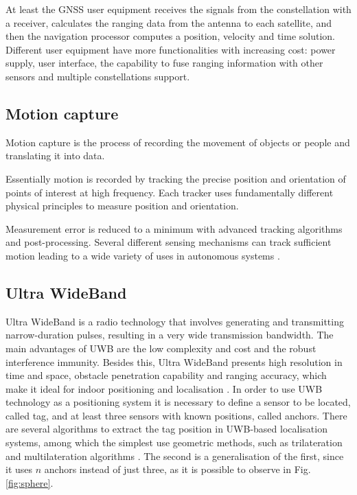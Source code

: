 \documentclass[journal]{IEEEtran}
\begin{document}
At least the GNSS user equipment receives the signals from the constellation with a receiver, calculates the ranging data from the antenna to each satellite, and then the navigation processor computes a position, velocity and time solution. Different user equipment have more functionalities with increasing cost: power supply, user interface, the capability to fuse ranging information with other sensors and multiple constellations support.

\subsection{Motion capture} 
Motion capture is the process of recording the movement of objects or people and translating it into data. 

Essentially motion is recorded by tracking the precise position and orientation of points of interest at high frequency. Each tracker uses fundamentally different physical principles to measure position and orientation.

Measurement error is reduced to a minimum with advanced tracking algorithms and post-processing. Several different sensing mechanisms can track sufficient motion leading to a wide variety of uses in autonomous systems \cite{Rahul2018ReviewOM}. 

\subsection{Ultra WideBand}
Ultra WideBand is a radio technology that involves generating and transmitting narrow-duration pulses, resulting in a very wide transmission bandwidth. The main advantages of UWB are the low complexity and cost and the robust interference immunity. Besides this, Ultra WideBand presents high resolution in time and space, obstacle penetration capability and ranging accuracy, which make it ideal for indoor positioning and localisation \cite{uwb_advantages}. In order to use UWB technology as a positioning system it is necessary to define a sensor to be located, called tag, and at least three sensors with known positions, called anchors. There are several algorithms to extract the tag position in UWB-based localisation systems, among which the simplest use geometric methods, such as trilateration and multilateration algorithms \cite{uwb_algorithms}. The second is a generalisation of the first, since it uses $n$ anchors instead of just three, as it is possible to observe in Fig. \ref{fig:sphere}. 
\end{document}
